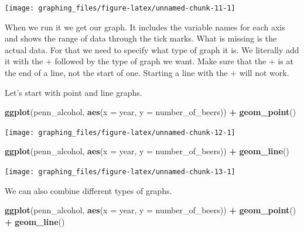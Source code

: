 \documentclass[
  12pt,
]{book}
\newenvironment{Shaded}{\begin{snugshade}}{\end{snugshade}}
\newcommand{\DataTypeTok}[1]{\textcolor[rgb]{0.13,0.29,0.53}{#1}}
\newcommand{\KeywordTok}[1]{\textcolor[rgb]{0.13,0.29,0.53}{\textbf{#1}}}
\newcommand{\NormalTok}[1]{#1}
\newcommand{\OperatorTok}[1]{\textcolor[rgb]{0.81,0.36,0.00}{\textbf{#1}}}
\newcommand{\StringTok}[1]{\textcolor[rgb]{0.31,0.60,0.02}{#1}}
\begin{document}
\begin{center}\texttt{[image: graphing\_files/figure-latex/unnamed-chunk-11-1]} \end{center}

When we run it we get our graph. It includes the variable names for each axis and shows the range of data through the tick marks. What is missing is the actual data. For that we need to specify what type of graph it is. We literally add it with the + followed by the type of graph we want. Make sure that the + is at the end of a line, not the start of one. Starting a line with the + will not work.

Let's start with point and line graphs.

\begin{Shaded}
\begin{Highlighting}[]
\KeywordTok{ggplot}\NormalTok{(penn\_alcohol, }\KeywordTok{aes}\NormalTok{(}\DataTypeTok{x =}\NormalTok{ year, }\DataTypeTok{y =}\NormalTok{ number\_of\_beers)) }\OperatorTok{+}
\StringTok{  }\KeywordTok{geom\_point}\NormalTok{()}
\end{Highlighting}
\end{Shaded}

\begin{center}\texttt{[image: graphing\_files/figure-latex/unnamed-chunk-12-1]} \end{center}

\begin{Shaded}
\begin{Highlighting}[]
\KeywordTok{ggplot}\NormalTok{(penn\_alcohol, }\KeywordTok{aes}\NormalTok{(}\DataTypeTok{x =}\NormalTok{ year, }\DataTypeTok{y =}\NormalTok{ number\_of\_beers)) }\OperatorTok{+}
\StringTok{  }\KeywordTok{geom\_line}\NormalTok{()}
\end{Highlighting}
\end{Shaded}

\begin{center}\texttt{[image: graphing\_files/figure-latex/unnamed-chunk-13-1]} \end{center}

We can also combine different types of graphs.

\begin{Shaded}
\begin{Highlighting}[]
\KeywordTok{ggplot}\NormalTok{(penn\_alcohol, }\KeywordTok{aes}\NormalTok{(}\DataTypeTok{x =}\NormalTok{ year, }\DataTypeTok{y =}\NormalTok{ number\_of\_beers)) }\OperatorTok{+}
\StringTok{  }\KeywordTok{geom\_point}\NormalTok{() }\OperatorTok{+}
\StringTok{  }\KeywordTok{geom\_line}\NormalTok{()}
\end{Highlighting}
\end{Shaded}
\end{document}

